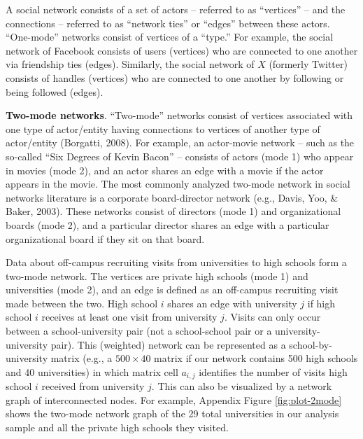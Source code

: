 \documentclass[
  12pt,
]{article}
\begin{document}
A social network consists of a set of actors -- referred to as ``vertices'' -- and the connections -- referred to as ``network ties'' or ``edges'' between these actors. ``One-mode'' networks consist of vertices of a ``type.'' For example, the social network of Facebook consists of users (vertices) who are connected to one another via friendship ties (edges). Similarly, the social network of \(X\) (formerly Twitter) consists of handles (vertices) who are connected to one another by following or being followed (edges).

\textbf{Two-mode networks}. ``Two-mode'' networks consist of vertices associated with one type of actor/entity having connections to vertices of another type of actor/entity (Borgatti, 2008). For example, an actor-movie network -- such as the so-called ``Six Degrees of Kevin Bacon'' -- consists of actors (mode 1) who appear in movies (mode 2), and an actor shares an edge with a movie if the actor appears in the movie. The most commonly analyzed two-mode network in social networks literature is a corporate board-director network (e.g., Davis, Yoo, \& Baker, 2003). These networks consist of directors (mode 1) and organizational boards (mode 2), and a particular director shares an edge with a particular organizational board if they sit on that board.

Data about off-campus recruiting visits from universities to high schools form a two-mode network. The vertices are private high schools (mode 1) and universities (mode 2), and an edge is defined as an off-campus recruiting visit made between the two. High school \(i\) shares an edge with university \(j\) if high school \(i\) receives at least one visit from university \(j\). Visits can only occur between a school-university pair (not a school-school pair or a university-university pair). This (weighted) network can be represented as a school-by-university matrix (e.g., a \(500 \times 40\) matrix if our network contains 500 high schools and 40 universities) in which matrix cell \(a_{i,j}\) identifies the number of visits high school \(i\) received from university \(j\). This can also be visualized by a network graph of interconnected nodes. For example, Appendix Figure \ref{fig:plot-2mode} shows the two-mode network graph of the 29 total universities in our analysis sample and all the private high schools they visited.
\end{document}
